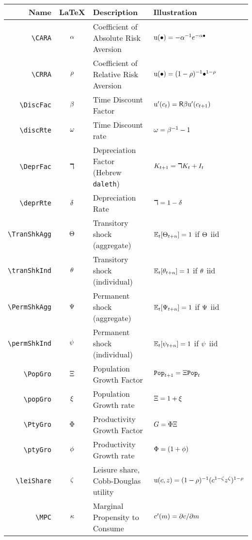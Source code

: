 \documentclass[12pt]{econtex}
\begin{document}
\begin{table}[h]
	\centering
	\begin{tabular}{|>{\ttfamily}rcll|} 		
		\hline
		 Name    & \LaTeX         & Description & Illustration
  \\ \hline
     \verb|\CARA|        & $\alpha$       & Coefficient of Absolute Risk Aversion &${\mathrm{u}}(\bullet)=-\alpha^{-1} e^{-\alpha \bullet}$
  \\ \verb|\CRRA|        & $\rho$       & Coefficient of Relative Risk Aversion & ${\mathrm{u}}(\bullet)=(1-\rho)^{-1}\bullet^{1-\rho}$ 
  \\ \verb|\DiscFac|     & $\beta$    & Time Discount Factor & ${\mathrm{u}}^{\prime}(c_{t}) =  \mathsf{R} \beta {\ensuremath{\mathrm{u}}}^{\prime}(c_{t+1})$
  \\ \verb|\discRte|     & $\omega$    & Time Discount rate & $\omega=\beta^{-1}-1$
  \\ \verb|\DeprFac|     & $\daleth$    & Depreciation Factor (Hebrew \texttt{daleth}) & ${K}_{t+1} = \daleth {K}_{t}+I_{t}$
  \\ \verb|\deprRte|     & $\delta$    & Depreciation Rate & $\daleth = 1-\delta$
  \\ \verb|\TranShkAgg|  & $\Theta$ & Transitory shock (aggregate) & $\operatorname{\mathbb{E}}_{t}[\Theta_{t+n}]=1$ if $\Theta$ iid
  \\ \verb|\tranShkInd|  & $\theta$ & Transitory shock (individual) &  $\operatorname{\mathbb{E}}_{t}[\theta_{t+n}]=1$ if $\theta$ iid
  \\ \verb|\PermShkAgg|  & $\Psi$ & Permanent shock (aggregate) & $\operatorname{\mathbb{E}}_{t}[\Psi_{t+n}]=1$ if $\Psi$ iid
  \\ \verb|\permShkInd|  & $\psi$ & Permanent shock (individual) & $\operatorname{\mathbb{E}}_{t}[\psi_{t+n}]=1$ if $\psi$ iid
  \\ \verb|\PopGro|  & $\Xi$ & Population Growth Factor & $\mathtt{Pop}_{t+1} = \Xi \mathtt{Pop}_{t}$
  \\ \verb|\popGro|  & $\xi$ & Population Growth rate & $\Xi = 1 + \xi$
  \\ \verb|\PtyGro|  & $\Phi$ & Productivity Growth Factor & $G = \Phi \Xi$
  \\ \verb|\ptyGro|  & $\phi$ & Productivity Growth rate & $\Phi = (1+\phi)$
  \\ \verb|\leiShare|  & $\zeta$ & Leisure share, Cobb-Douglas utility & ${\mathrm{u}}(c,z)=(1-\rho)^{-1}(c^{1-\zeta}z^{\zeta})^{1-\rho}$
  \\ \verb|\MPC|  & $\kappa$ & Marginal Propensity to Consume & $\mathrm{c}^{\prime}(m)=\partial c/\partial m$

\end{tabular}
\end{table}
\end{document}
